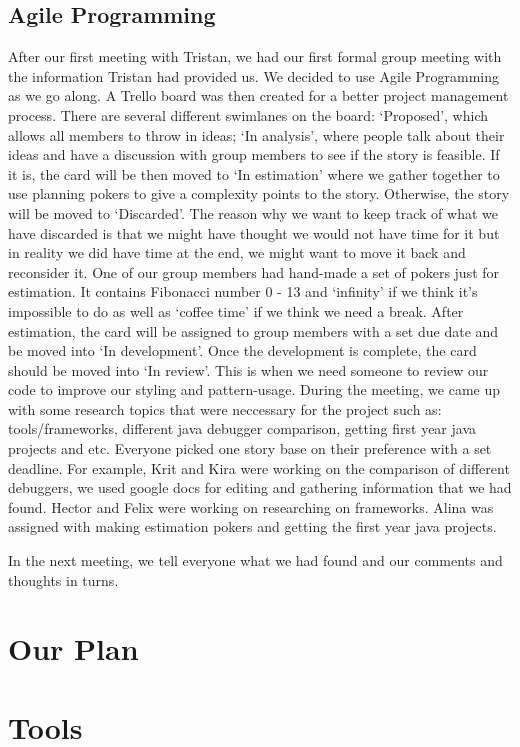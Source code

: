 \documentclass[11pt]{article}
\begin{document}
\subsection{Agile Programming}
After our first meeting with Tristan, we had our first formal group meeting with the information Tristan had provided us. We decided to use Agile Programming as we go along. A Trello board was then created for a better project management process. There are several different swimlanes on the board: ‘Proposed’, which allows all members to throw in ideas; ‘In analysis’, where people talk about their ideas and have a discussion with group members to see if the story is feasible. If it is, the card will be then moved to ‘In estimation’ where we gather together to use planning pokers to give a complexity points to the story. Otherwise, the story will be moved to ‘Discarded’. The reason why we want to keep track of what we have discarded is that we might have thought we would not have time for it but in reality we did have time at the end, we might want to move it back and reconsider it. One of our group members had hand-made a set of pokers just for estimation. It contains Fibonacci number 0 - 13 and ‘infinity’ if we think it’s impossible to do as well as ‘coffee time’ if we think we need a break. After estimation, the card will be assigned to group members with a set due date and be moved into ‘In development’. Once the development is complete, the card should be moved into ‘In review’. This is when we need someone to review our code to improve our styling and pattern-usage. During the meeting, we came up with some research topics that were neccessary for the project such as: tools/frameworks, different java debugger comparison, getting first year java projects and etc. Everyone picked one story base on their preference with a set deadline. For example, Krit and Kira were working on the comparison of different debuggers, we used google docs for editing and gathering information that we had found. Hector and Felix were working on researching on frameworks. Alina was assigned with making estimation pokers and getting the first year java projects. 

In the next meeting, we tell everyone what we had found and our comments and thoughts in turns.

\section{Our Plan}

\section{Tools}
\end{document}
